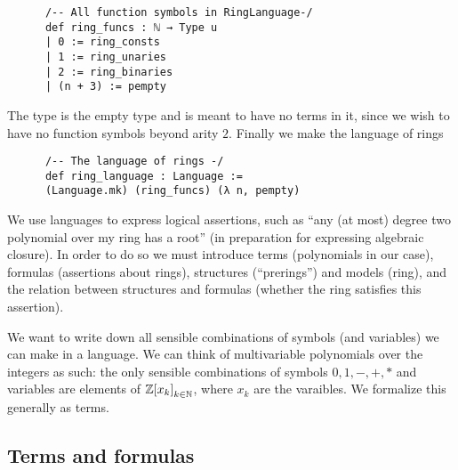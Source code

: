\begin{dfn}
    \begin{lstlisting}
      /-- All function symbols in RingLanguage-/
      def ring_funcs : ℕ → Type u
      | 0 := ring_consts
      | 1 := ring_unaries
      | 2 := ring_binaries
      | (n + 3) := pempty\end{lstlisting}

    The type  is the empty type and is meant to have no terms in it,
    since we wish to have no function symbols beyond arity $2$.
    Finally we make the language of rings

    \begin{lstlisting}
      /-- The language of rings -/
      def ring_language : Language :=
      (Language.mk) (ring_funcs) (λ n, pempty)\end{lstlisting}
\end{dfn}

We use languages to express logical assertions, such as
``any (at most) degree two polynomial over my ring has a root''
(in preparation for expressing algebraic closure).
In order to do so we must introduce terms (polynomials in our case),
formulas (assertions about rings), structures (``prerings'') and models (ring),
and the relation between structures and formulas
(whether the ring satisfies this assertion).

We want to write down all sensible combinations of symbols (and variables)
we can make in a language.
We can think of multivariable polynomials over the integers as such:
the only sensible combinations of symbols $0,1,-,+,*$ and variables
are elements of $\mathbb{Z}{[x_{k}]}_{k \in \mathbb{N}}$,
where $x_{k}$ are the varaibles. We formalize this generally as terms.

\subsection{Terms and formulas}

